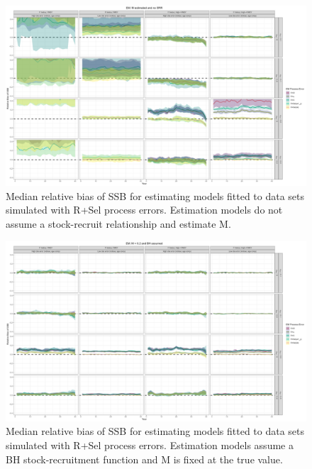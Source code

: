\documentclass[
  12pt,
]{article}
\begin{document}
\begin{landscape}
\begin{figure}
\caption{Median relative bias of SSB for estimating models fitted to data sets simulated with R+Sel process errors. Estimation models do not assume a stock-recruit relationship and estimate M.}\label{Sel_om_em_R_ME_relbias_ssb}
\begin{center}
\includegraphics[width = \textwidth]{Sel_om_R_ME_relbias_ssb.png}
\end{center}
\end{figure}
\end{landscape}

\begin{landscape}
\begin{figure}
\caption{Median relative bias of SSB for estimating models fitted to data sets simulated with R+Sel process errors. Estimation models assume a BH stock-recruitment function and M is fixed at the true value.}\label{Sel_om_em_BH_MF_relbias_ssb}
\begin{center}
\includegraphics[width = \textwidth]{Sel_om_BH_MF_relbias_ssb.png}
\end{center}
\end{figure}
\end{landscape}
\end{document}
